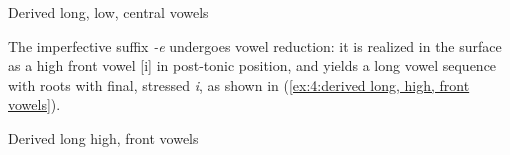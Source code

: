 \break

\ea\label{ex:4:derived long, low, central vowels}
{Derived long, low, central vowels}

    \z
\z

The imperfective suffix \textit{-e} undergoes vowel reduction: it is realized in the surface as a high front vowel [i] in post-tonic position, and yields a long vowel sequence with roots with final, stressed \textit{i}, as shown in (\ref{ex:4:derived long, high, front vowels}).

\ea\label{ex:4:derived long, high, front vowels}
{Derived long high, front vowels}

